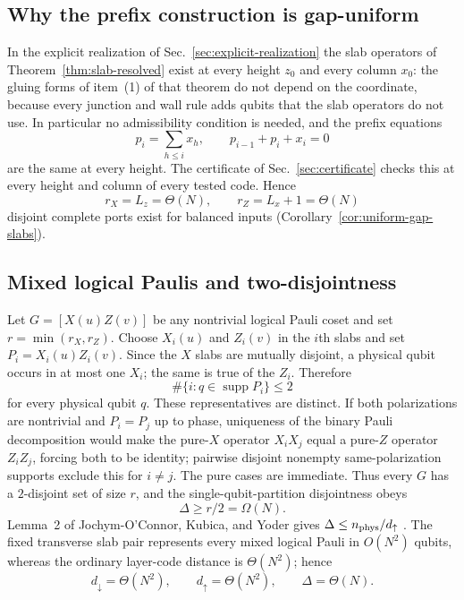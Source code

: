 \documentclass[aps,prx,reprint,superscriptaddress,nofootinbib,floatfix,longbibliography]{revtex4-2}
\theoremstyle{definition}
\begin{document}
\subsection{Why the prefix construction is gap-uniform}
In the explicit realization of Sec.~\ref{sec:explicit-realization} the slab
operators of Theorem~\ref{thm:slab-resolved} exist at every height $z_0$ and
every column $x_0$: the gluing forms of item~(1) of that theorem do not
depend on the coordinate, because every junction and wall rule adds qubits
that the slab operators do not use.  In particular no admissibility condition
is needed, and the prefix equations
\begin{equation}
 p_i=\sum_{h\le i}x_h,\qquad p_{i-1}+p_i+x_i=0 \tag{S33}
\end{equation}
are the same at every height.  The certificate of Sec.~\ref{sec:certificate}
checks this at every height and column of every tested code.  Hence
\begin{equation}
 r_X=L_z=\Theta(N),\qquad r_Z=L_x+1=\Theta(N) \tag{S34}
\end{equation}
disjoint complete ports exist for balanced inputs (Corollary~\ref{cor:uniform-gap-slabs}).

\subsection{Mixed logical Paulis and two-disjointness}
Let $G=[X(u)Z(v)]$ be any nontrivial logical Pauli coset and set
$r=\min(r_X,r_Z)$.  Choose $X_i(u)$ and $Z_i(v)$ in the $i$th slabs and set
$P_i=X_i(u)Z_i(v)$.  Since the $X$ slabs are mutually disjoint, a physical
qubit occurs in at most one $X_i$; the same is true of the $Z_i$.  Therefore
\begin{equation}
 \#\{i:q\in\operatorname{supp}P_i\}\le2 \tag{S35}
\end{equation}
for every physical qubit $q$.  These representatives are distinct.  If both
polarizations are nontrivial and $P_i=P_j$ up to phase, uniqueness of the
binary Pauli decomposition would make the pure-$X$ operator $X_iX_j$ equal a
pure-$Z$ operator $Z_iZ_j$, forcing both to be identity; pairwise disjoint
nonempty same-polarization supports exclude this for $i\ne j$.  The pure cases
are immediate.  Thus every $G$ has a $2$-disjoint set of size $r$, and the
single-qubit-partition disjointness obeys
\begin{equation}
 \Delta\ge r/2=\Omega(N). \tag{S36}
\end{equation}
Lemma~2 of Jochym-O'Connor, Kubica, and Yoder gives
$\Delta\le n_{\rm phys}/d_\uparrow$ \cite{JochymDisjointness}.  The fixed
transverse slab pair represents every mixed logical Pauli in $O(N^2)$ qubits,
whereas the ordinary layer-code distance is $\Theta(N^2)$; hence
\begin{equation}
 d_\downarrow=\Theta(N^2),\qquad d_\uparrow=\Theta(N^2),\qquad
 \Delta=\Theta(N). \tag{S37}
\end{equation}
\end{document}
